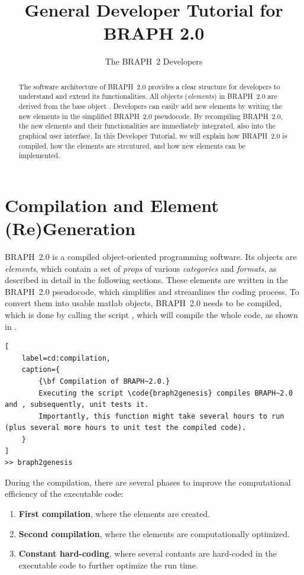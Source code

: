 \documentclass{tufte-handout}
\title{General Developer Tutorial for BRAPH 2.0}
\author[The BRAPH~2 Developers]{The BRAPH~2 Developers}
\begin{document}
\maketitle

\begin{abstract}
\noindent
The software architecture of BRAPH~2.0 provides a clear structure for developers to understand and extend its functionalities. All objects (\emph{elements}) in BRAPH~2.0 are derived from the base object . Developers can easily add new elements by writing the new elements in the simplified BRAPH~2.0 pseudocode. 
By recompiling BRAPH~2.0, the new elements and their functionalities are immediately integrated, also into the graphical user interface.
In this Developer Tutorial, we will explain how BRAPH~2.0 is compiled, how the elements are strcutured, and how new elements can be implemented.
\end{abstract}

\tableofcontents

\clearpage
\section{Compilation and Element (Re)Generation}

BRAPH~2.0 is a compiled object-oriented programming software.
Its objects are \emph{elements}, which contain a set of \emph{props} of various \emph{categories} and \emph{formats}, as described in detail in the following sections. 
These elements are written in the BRAPH~2.0 pseudocode, which simplifies and streamlines the coding process.
To convert them into usable matlab objects, BRAPH~2.0 needs to be compiled, which is done by calling the script , which will compile the whole code, as shown in .
%
\begin{lstlisting}[
	label=cd:compilation,
	caption={
		{\bf Compilation of BRAPH~2.0.}
		Executing the script \code{braph2genesis} compiles BRAPH~2.0 and , subsequently, unit tests it.
		Importantly, this function might take several hours to run (plus several more hours to unit test the compiled code).
	}
]
>> braph2genesis
\end{lstlisting}

During the compilation, there are several phases to improve the computational efficiency of the executable code:
\begin{enumerate}
	\item {\bf First compilation}, where the elements are created.
	\item {\bf Second compilation}, where the elements are computationally optimized.
	\item {\bf Constant hard-coding}, where several contants are hard-coded in the executable code to further optimize the run time.
\end{enumerate}
\end{document}
